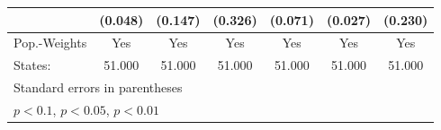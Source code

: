 {\begin{tabular}{l*{6}{c}}
            &     (0.048)         &     (0.147)         &     (0.326)         &     (0.071)         &     (0.027)         &     (0.230)         \\
\hline
Pop.-Weights&         Yes         &         Yes         &         Yes         &         Yes         &         Yes         &         Yes         \\
States:     &      51.000         &      51.000         &      51.000         &      51.000         &      51.000         &      51.000         \\
\hline\hline
\multicolumn{7}{l}{\footnotesize Standard errors in parentheses}\\
\multicolumn{7}{l}{\footnotesize \sym{*} \(p<0.1\), \sym{**} \(p<0.05\), \sym{***} \(p<0.01\)}\\
\end{tabular}
}
